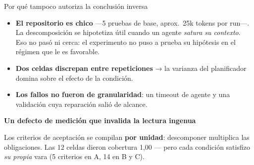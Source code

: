 \documentclass[10pt,aspectratio=169]{beamer}
\begin{document}
\begin{frame}{Por qué tampoco autoriza la conclusión inversa}
  \begin{itemize}
    \item \textbf{El repositorio es chico} —5 pruebas de base, aprox.\ 25k tokens por
      run—. La descomposición se hipotetiza útil cuando un agente \emph{satura su
      contexto}. Eso no pasó ni cerca: el experimento no puso a prueba su
      hipótesis en el régimen que le es favorable.
    \item \textbf{Dos celdas discrepan entre repeticiones} → la varianza del
      planificador domina sobre el efecto de la condición.
    \item \textbf{Los fallos no fueron de granularidad}: un timeout de agente y
      una validación cuya reparación salió de alcance.
  \end{itemize}

  \pause
  \bigskip
  \begin{center}
    \textbf{Un defecto de medición que invalida la lectura ingenua}
  \end{center}
  Los criterios de aceptación se compilan \textbf{por unidad}: descomponer
  multiplica las obligaciones. Las 12 celdas dieron cobertura 1{,}00 — pero cada
  condición satisfizo \emph{su propia} vara (5 criterios en A, 14 en B y C).
\end{frame}
\end{document}
